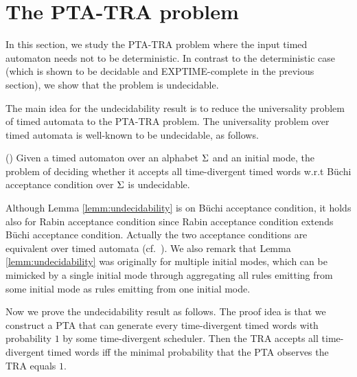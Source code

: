 \section{The PTA-TRA problem}
In this section, we study the PTA-TRA problem where the input timed automaton needs not to be deterministic.
In contrast to the deterministic case (which is shown to be decidable and EXPTIME-complete in the previous section), 
we show that the problem is undecidable.

\smallskip
{} The main idea for the undecidability result is to reduce the universality problem of timed automata to the PTA-TRA problem. The universality problem over timed automata is well-known to be undecidable, as follows.

%
%
\begin{lemma}{(\cite[Theorem 5.2]{DBLP:journals/tcs/AlurD94})}\label{lemm:undecidability}
Given a timed automaton over an alphabet $\Sigma$ and an initial mode, the problem of deciding whether it accepts all time-divergent timed words w.r.t B\"{u}chi acceptance condition over $\Sigma$ is undecidable.
\end{lemma}
%
Although Lemma \ref{lemm:undecidability} is on  B\"{u}chi acceptance condition, it holds also for Rabin acceptance condition since Rabin acceptance condition extends  B\"{u}chi acceptance condition.
Actually the two acceptance conditions are equivalent over timed automata (cf.~\cite[Theorem 3.20]{DBLP:journals/tcs/AlurD94}). We also remark that Lemma \ref{lemm:undecidability} was originally for multiple initial modes, which can be mimicked by a single initial mode through aggregating all rules emitting from some initial mode as rules emitting from one initial mode. 

Now we prove the undecidability result as follows.
The proof idea is that we construct a PTA that can generate every time-divergent timed words with probability $1$ by some time-divergent scheduler.
Then the TRA accepts all time-divergent timed words iff the minimal probability that the PTA observes the TRA equals $1$.

